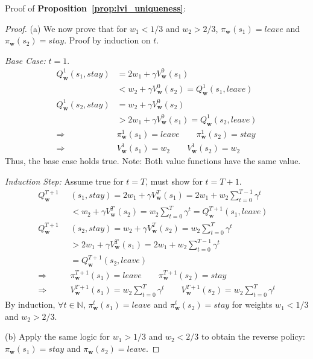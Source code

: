 Proof of {\bf Proposition~\ref{prop:lvi_uniqueness}}:
\begin{proof}
(a) We now prove that for $w_1 < 1/3$ and $w_2 > 2/3$, $\pi_\mathbf{w}(s_1) = leave$ and $\pi_\mathbf{w}(s_2) = stay$. Proof by induction on $t$.

\emph{Base Case:} $t = 1$.
\begin{align*}
    Q_\mathbf{w}^1(s_1, stay) &= 2 w_1 + \gamma V_\mathbf{w}^0(s_1) \\
        &< w_2 + \gamma V_\mathbf{w}^0(s_2) = Q_\mathbf{w}^1(s_1, leave) \\
    Q_\mathbf{w}^1(s_2, stay) &= w_2 + \gamma V_\mathbf{w}^0(s_2) \\
        &> 2 w_1 + \gamma V_\mathbf{w}^0(s_1) = Q_\mathbf{w}^1(s_2, leave) \\
    \Rightarrow \quad \quad &\pi_\mathbf{w}^1(s_1) = leave \quad \quad \pi_\mathbf{w}^1(s_2) = stay \\
    \Rightarrow \quad \quad &V_\mathbf{w}^1(s_1) = w_2 \quad \quad V_\mathbf{w}^1(s_2) = w_2
\end{align*}
Thus, the base case holds true. Note: Both value functions have the same value.

\emph{Induction Step:} Assume true for $t = T$, must show for $t = T + 1$.
\begin{align*}
    Q_\mathbf{w}^{T+1}&(s_1, stay) = 2 w_1 + \gamma V_\mathbf{w}^T(s_1) = 2 w_1 + w_2 \sum_{t=0}^{T-1} \gamma^t \\
        &< w_2 + \gamma V_\mathbf{w}^T(s_2) = w_2 \sum_{t=0}^T \gamma^t = Q_\mathbf{w}^{T+1}(s_1, leave) \\
    Q_\mathbf{w}^{T+1}&(s_2, stay) = w_2 + \gamma V_\mathbf{w}^T(s_2) = w_2 \sum_{t=0}^T \gamma^t \\
        &> 2 w_1 + \gamma V_\mathbf{w}^T(s_1) = 2 w_1 + w_2 \sum_{t=0}^{T-1} \gamma^t \\
        &= Q_\mathbf{w}^{T+1}(s_2, leave) \\
    \Rightarrow \quad \quad &\pi_\mathbf{w}^{T+1}(s_1) = leave \quad \quad \pi_\mathbf{w}^{T+1}(s_2) = stay \\
    \Rightarrow \quad \quad &V_\mathbf{w}^{T+1}(s_1) = w_2 \sum_{t=0}^T \gamma^t \quad \quad V_\mathbf{w}^{T+1}(s_2) = w_2 \sum_{t=0}^T \gamma^t 
\end{align*}
By induction, $\forall t \in \mathbb{N}$, $\pi_\mathbf{w}^t(s_1) = leave$ and $\pi_\mathbf{w}^t(s_2) = stay$ for weights $w_1 < 1/3$ and $w_2 > 2/3$.

(b) Apply the same logic for $w_1 > 1/3$ and $w_2 < 2/3$ to obtain the reverse policy: $\pi_\mathbf{w}(s_1) = stay$ and $\pi_\mathbf{w}(s_2) = leave$.


\end{proof}
